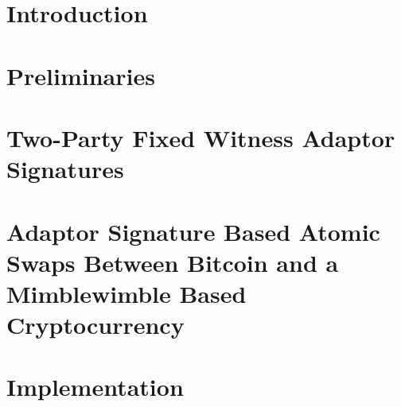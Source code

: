 \documentclass[draft,final]{vutinfth} %
\theoremstyle{definition}
\begin{document}

\tableofcontents %

\mainmatter

\newtheorem{theorem}{Theorem}

\chapter{Introduction}\label{ch:introduction}


%

\chapter{Preliminaries}\label{ch:preliminaries}


\chapter{Two-Party Fixed Witness Adaptor Signatures}\label{ch:fixedwitnesssignatures}


\chapter{Adaptor Signature Based Atomic Swaps Between Bitcoin and a Mimblewimble Based Cryptocurrency}\label{ch:atomicswap}


\chapter{Implementation}\label{ch:implementation}


%
%
%
%
%
\end{document}
